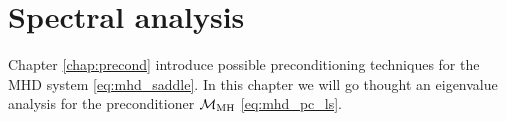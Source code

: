 \chapter{Spectral analysis}

Chapter \ref{chap:precond} introduce possible preconditioning techniques for the MHD system \eqref{eq:mhd_saddle}. In this chapter we will go thought an eigenvalue analysis for the preconditioner $\mathcal{M}_{\rm MH}$ \eqref{eq:mhd_pc_ls}.



